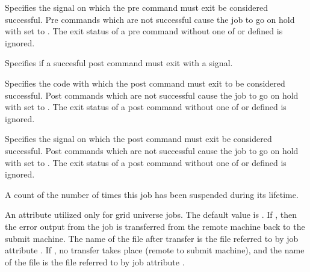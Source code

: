 \begin{description}
\item[\AdAttr{SuccessPreExitSignal}:] Specifies the signal on which the
pre command must exit be considered successful. Pre commands which are not
successful cause the job to go on hold with  set to
. The exit status of a pre command without one of
 or  defined is
ignored.

\item[\AdAttr{SuccessPostExitBySignal}:] Specifies if a succesful post command
must exit with a signal.

\item[\AdAttr{SuccessPostExitCode}:] Specifies the code with which the post
command must exit to be considered successful. Post commands which are
not successful cause the job to go on hold with  set to
. The exit status of a post command without one of
 or  defined is
ignored.

\item[\AdAttr{SuccessPostExitSignal}:] Specifies the signal on which the
post command must exit be considered successful. Post commands which are not
successful cause the job to go on hold with  set to
. The exit status of a post command without one of
 or  defined is
ignored.

\item[\AdAttr{TotalSuspensions}:]  A count of the number of times this job
has been suspended during its lifetime.

\item[\AdAttr{TransferErr}:]   
An attribute utilized only for grid universe jobs.
The default value is .
If , then the error output from the job
is transferred from the remote machine back to the submit machine.
The name of the file after transfer is the file referred to
by job attribute .
If , no transfer takes place (remote to submit machine),
and the name of the file is the file referred to
by job attribute .


\end{description}
